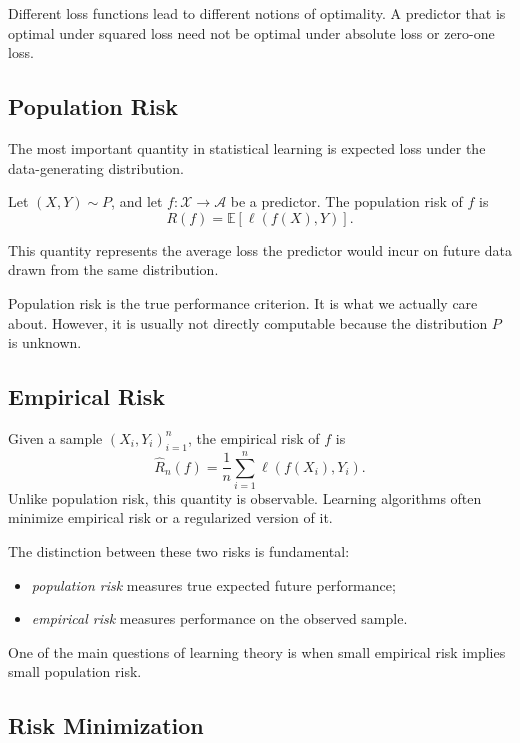 Different loss functions lead to different notions of optimality. A predictor that is optimal under squared loss need not be optimal under absolute loss or zero-one loss.

\subsection{Population Risk}

The most important quantity in statistical learning is expected loss under the data-generating distribution.

\begin{definition}
Let $(X,Y)\sim P$, and let $f:\mathcal{X}\to\mathcal{A}$ be a predictor. The population risk of $f$ is
\[
R(f) = \mathbb{E}[\ell(f(X),Y)].
\]
\end{definition}

This quantity represents the average loss the predictor would incur on future data drawn from the same distribution.

Population risk is the true performance criterion. It is what we actually care about. However, it is usually not directly computable because the distribution $P$ is unknown.

\subsection{Empirical Risk}

Given a sample $(X_i,Y_i)_{i=1}^n$, the empirical risk of $f$ is
\[
\widehat{R}_n(f) = \frac{1}{n}\sum_{i=1}^n \ell(f(X_i),Y_i).
\]
Unlike population risk, this quantity is observable. Learning algorithms often minimize empirical risk or a regularized version of it.

The distinction between these two risks is fundamental:
\begin{itemize}
    \item \emph{population risk} measures true expected future performance;
    \item \emph{empirical risk} measures performance on the observed sample.
\end{itemize}

One of the main questions of learning theory is when small empirical risk implies small population risk.

\subsection{Risk Minimization}

